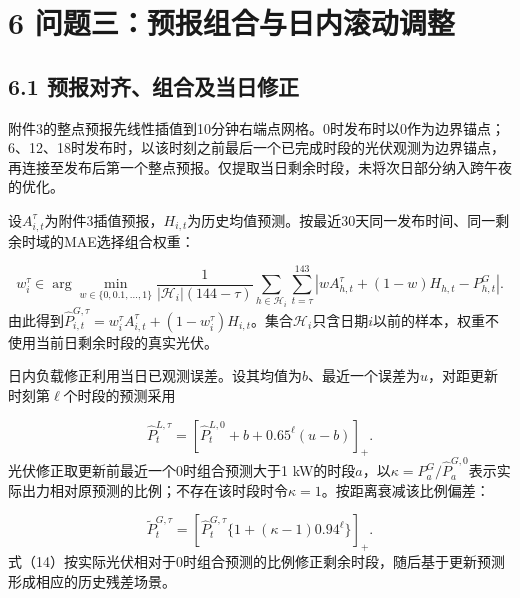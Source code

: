 \documentclass[UTF8,a4paper,zihao=-4,fontset=windows]{ctexart}
\begin{document}
\section{6 问题三：预报组合与日内滚动调整}
\subsection{6.1 预报对齐、组合及当日修正}
附件3的整点预报先线性插值到10分钟右端点网格。0时发布时以0作为边界锚点；6、12、18时发布时，以该时刻之前最后一个已完成时段的光伏观测为边界锚点，再连接至发布后第一个整点预报。仅提取当日剩余时段，未将次日部分纳入跨午夜的优化。
\par
设$A_{i,t}^{\tau}$为附件3插值预报，$H_{i,t}$为历史均值预测。按最近30天同一发布时间、同一剩余时域的MAE选择组合权重：
\par
\begin{equation}
w_i^{\tau}\in\arg\min_{w\in\{0,0.1,\ldots,1\}}\frac{1}{|\mathcal H_i|(144-\tau)}\sum_{h\in\mathcal H_i}\sum_{t=\tau}^{143}\left|wA_{h,t}^{\tau}+(1-w)H_{h,t}-P^G_{h,t}\right|. \tag{12}
\end{equation}
由此得到$\widehat P_{i,t}^{G,\tau}=w_i^{\tau}A_{i,t}^{\tau}+(1-w_i^{\tau})H_{i,t}$。集合$\mathcal H_i$只含日期$i$以前的样本，权重不使用当前日剩余时段的真实光伏。
\par
日内负载修正利用当日已观测误差。设其均值为$b$、最近一个误差为$u$，对距更新时刻第$\ell$个时段的预测采用
\par
\begin{equation}
\widehat P_{t}^{L,\tau}=\left[\widehat P_t^{L,0}+b+0.65^{\ell}(u-b)\right]_+. \tag{13}
\end{equation}
光伏修正取更新前最近一个0时组合预测大于1 kW的时段$a$，以$\kappa=P^G_a/\widehat P_a^{G,0}$表示实际出力相对原预测的比例；不存在该时段时令$\kappa=1$。按距离衰减该比例偏差：
\par
\begin{equation}
\widetilde P_t^{G,\tau}=\left[\widehat P_t^{G,\tau}\{1+(\kappa-1)0.94^{\ell}\}\right]_+. \tag{14}
\end{equation}
式（14）按实际光伏相对于0时组合预测的比例修正剩余时段，随后基于更新预测形成相应的历史残差场景。
\par
\end{document}
